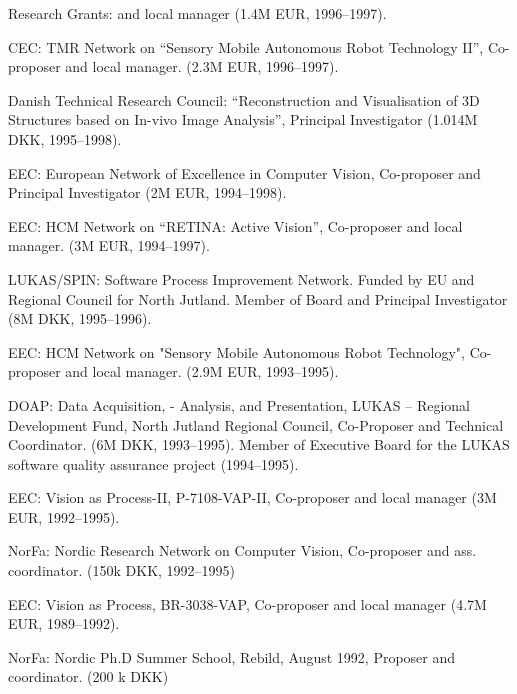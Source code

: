 \documentclass{article}
\begin{document}
\begin{cv}
\begin{cvlist}{Research Grants:}
  and local manager (1.4M EUR, 1996--1997).%
\item CEC: TMR Network on ``Sensory Mobile Autonomous Robot Technology
  II'', Co-proposer and local manager.  (2.3M EUR, 1996--1997).%
\item Danish Technical Research Council: ``Reconstruction and
  Visualisation of 3D Structures based on In-vivo Image Analysis'',
  Principal Investigator (1.014M DKK, 1995--1998).%
\item EEC: European Network of Excellence in Computer Vision,
  Co-proposer and Principal Investigator (2M EUR, 1994--1998).%
\item EEC: HCM Network on ``RETINA: Active Vision'', Co-proposer and
  local manager.  (3M EUR, 1994--1997).%
\item LUKAS/SPIN: Software Process Improvement Network. Funded by EU
  and Regional Council for North Jutland. Member of Board and
  Principal Investigator (8M DKK, 1995--1996).%
\item EEC: HCM Network on "Sensory Mobile Autonomous Robot
  Technology", Co-proposer and local manager.  (2.9M EUR,
  1993--1995).%
\item DOAP: Data Acquisition, - Analysis, and Presentation, LUKAS --
  Regional Development Fund, North Jutland Regional Council,
  Co-Proposer and Technical Coordinator. (6M DKK, 1993--1995). Member
  of  Executive Board for the LUKAS software quality assurance project
  (1994--1995).%
\item EEC: Vision as Process-II, P-7108-VAP-II, Co-proposer and local
  manager (3M EUR, 1992--1995).%
\item NorFa: Nordic Research Network on Computer Vision, Co-proposer
  and ass. coordinator.  (150k DKK, 1992--1995)%
\item EEC: Vision as Process, BR-3038-VAP, Co-proposer and local
  manager (4.7M EUR, 1989--1992).%
\item NorFa: Nordic Ph.D Summer School, Rebild, August 1992, Proposer
  and coordinator. (200 k DKK)%
\end{cvlist}


\end{cv}
\end{document}
